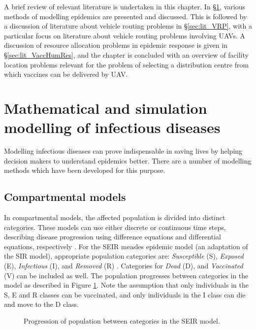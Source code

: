 A brief review of relevant literature is undertaken in this chapter. In \S \ref{sec:lit_matSim}, various methods of modelling epidemics are presented and discussed. This is followed by a discussion of literature about vehicle routing problems in \S \ref{sec:lit_VRP}, with a particular focus on literature about vehicle routing problems involving UAVs. A discussion of resource allocation problems in epidemic response is given in \S \ref{sec:lit_VaccHumRes}, and the chapter is concluded with an overview of facility location problems relevant for the problem of selecting a distribution centre from which vaccines can be delivered by UAV.

\section{Mathematical and simulation modelling of infectious diseases}
\label{sec:lit_matSim}
Modelling infectious diseases can prove indispensable in saving lives by helping decision makers to understand epidemics better. There are a number of modelling methods which have been developed for this purpose.

\subsection{Compartmental models}
\label{sec:lit_SEIR}
In compartmental models, the affected population is divided into distinct categories. These models can use either discrete or continuous time steps, describing disease progression using difference equations and differential equations, respectively \cite{selvam_2015}. For the SEIR measles epidemic model (an adaptation of the SIR model), appropriate population categories are: \textit{Susceptible} (S), \textit{Exposed} (E), \textit{Infectious} (I), and \textit{Removed} (R) \cite{chitnis_2017}. Categories for \textit{Dead} (D), and \textit{Vaccinated} (V) can be included as well. The population progresses between categories in the model as described in Figure \ref{fig:lit_SEIR}. Note the assumption that only individuals in the S, E and R classes can be vaccinated, and only individuals in the I class can die and move to the D class.

\begin{figure}[ht!]{\textwidth}
    \centering
    \resizebox{0.5\textwidth}{!}{}
    \caption{Progression of population between categories in the SEIR model.}
    \label{fig:lit_SEIR}
\end{figure}

